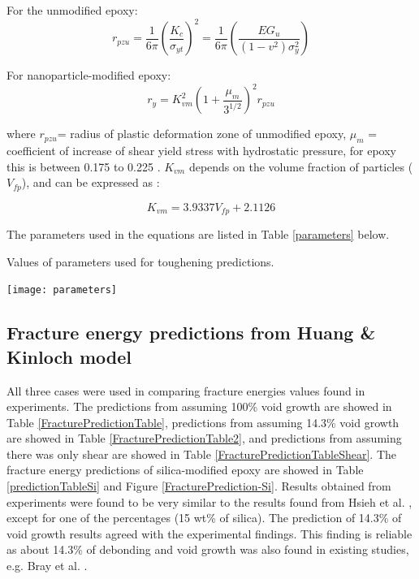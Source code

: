 \documentclass[numbers=noendperiod,chapterprefix=on]{icldt} %
\begin{document}
For the unmodified epoxy: \\

\begin{equation} 
r_{pzu}=\frac{1}{6π}
\left( \frac {K_c}{\sigma_{yt}}\right) ^2 = \frac {1}{6π}  \left(\frac{EG_u}{(1-v^2)\sigma_y^2}\right) 
\end{equation}

For nanoparticle-modified epoxy: \\
\begin{equation}
r_y=K_{vm}^2
\left(1+\frac {\mu_m}{3^{1/2}}\right)^2r_{pzu}
\end{equation}

where $r_{pzu}$= radius of plastic deformation zone of unmodified epoxy, $\mu_m$ = coefficient of increase of shear yield stress with hydrostatic pressure, for epoxy this is between 0.175 to 0.225 \cite{Chen2013}.
$ K_{vm} $ depends on the volume fraction of particles ($V_{fp}$), and can be expressed as \cite{Mohammed2007}: 

\begin{equation} 
K_{vm}=3.9337V_{fp}+2.1126
\end{equation}

The parameters used in the equations are listed in Table \ref{parameters} below.

\begin{table}[!htpb]
\centering
\caption{Values of parameters used for toughening predictions.} \label{parameters}
\texttt{[image: parameters]}
\end{table}
\FloatBarrier

\subsection{Fracture energy predictions from Huang \& Kinloch model} \label{Fracture_model_results}

All three cases were used in comparing fracture energies values found in experiments. 
The predictions from assuming 100\% void growth are showed in Table \ref{FracturePredictionTable}, predictions from assuming 14.3\% void growth are showed in Table \ref{FracturePredictionTable2}, and predictions from assuming there was only shear are showed in Table \ref{FracturePredictionTableShear}. The fracture energy predictions of silica-modified epoxy are showed in Table \ref{predictionTableSi} and Figure \ref{FracturePrediction-Si}. Results obtained from experiments were found to be very similar to the results found from Hsieh et al. \cite{Hsieh2010a}, except for one of the percentages (15 wt\% of silica). The prediction of 14.3\% of void growth results agreed with the experimental findings. This finding is reliable as about 14.3\% of debonding and void growth was also found in existing studies, e.g. Bray et al. \cite{Masania2010}. 
\end{document}
